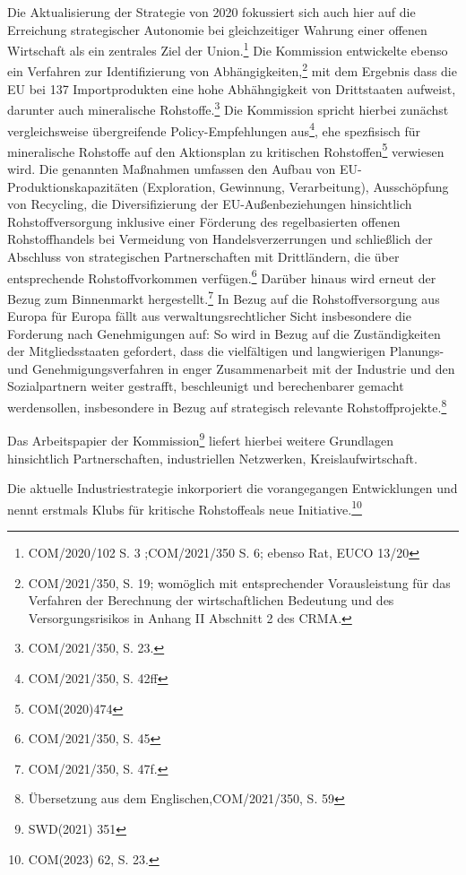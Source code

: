 \documentclass[12pt,a4paper,oneside]{book} %
\begin{document}
Die Aktualisierung der Strategie von 2020 fokussiert sich auch hier auf die Erreichung strategischer Autonomie bei gleichzeitiger Wahrung einer offenen Wirtschaft als ein zentrales Ziel der Union.\footnote{COM/2020/102 S. 3  ;COM/2021/350 S. 6; ebenso Rat, EUCO 13/20} Die Kommission entwickelte ebenso ein Verfahren zur Identifizierung von Abhängigkeiten,\footnote{COM/2021/350, S. 19; womöglich mit entsprechender Vorausleistung für das Verfahren der Berechnung der wirtschaftlichen Bedeutung und des Versorgungsrisikos in Anhang II Abschnitt 2 des CRMA.} mit dem Ergebnis dass die EU bei 137 Importprodukten eine hohe Abhähngigkeit von Drittstaaten aufweist, darunter auch mineralische Rohstoffe.\footnote{COM/2021/350, S. 23.} Die Kommission spricht hierbei zunächst vergleichsweise übergreifende Policy-Empfehlungen aus\footnote{COM/2021/350, S. 42ff}, ehe spezfisisch für mineralische Rohstoffe auf den Aktionsplan zu kritischen Rohstoffen\footnote{ COM(2020)474} verwiesen wird. Die genannten Maßnahmen umfassen den Aufbau von EU-Produktionskapazitäten (Exploration, Gewinnung, Verarbeitung), Ausschöpfung von Recycling, die Diversifizierung der EU-Außenbeziehungen hinsichtlich Rohstoffversorgung inklusive einer Förderung des regelbasierten offenen Rohstoffhandels bei Vermeidung von Handelsverzerrungen und schließlich der Abschluss von strategischen Partnerschaften mit Drittländern, die über entsprechende Rohstoffvorkommen verfügen.\footnote{COM/2021/350, S. 45} Darüber hinaus wird erneut der Bezug zum Binnenmarkt hergestellt.\footnote{COM/2021/350, S. 47f.} In Bezug auf die Rohstoffversorgung aus Europa für Europa fällt aus verwaltungsrechtlicher Sicht insbesondere die Forderung nach Genehmigungen auf: So wird in Bezug auf die Zuständigkeiten der Mitgliedsstaaten gefordert, dass die \glqq vielfältigen und langwierigen Planungs- und Genehmigungsverfahren in enger Zusammenarbeit mit der Industrie und den Sozialpartnern weiter gestrafft, beschleunigt und berechenbarer gemacht werden\glqq sollen, insbesondere in Bezug auf strategisch relevante Rohstoffprojekte.\grqq \footnote{Übersetzung aus dem Englischen,COM/2021/350, S. 59}

Das Arbeitspapier der Kommission\footnote{SWD(2021) 351} liefert hierbei weitere Grundlagen hinsichtlich Partnerschaften, industriellen Netzwerken, Kreislaufwirtschaft.

Die aktuelle Industriestrategie inkorporiert die vorangegangen Entwicklungen und nennt erstmals \glqq Klubs für kritische Rohstoffe\grqq als neue Initiative.\footnote{COM(2023) 62, S. 23.}
\end{document}
